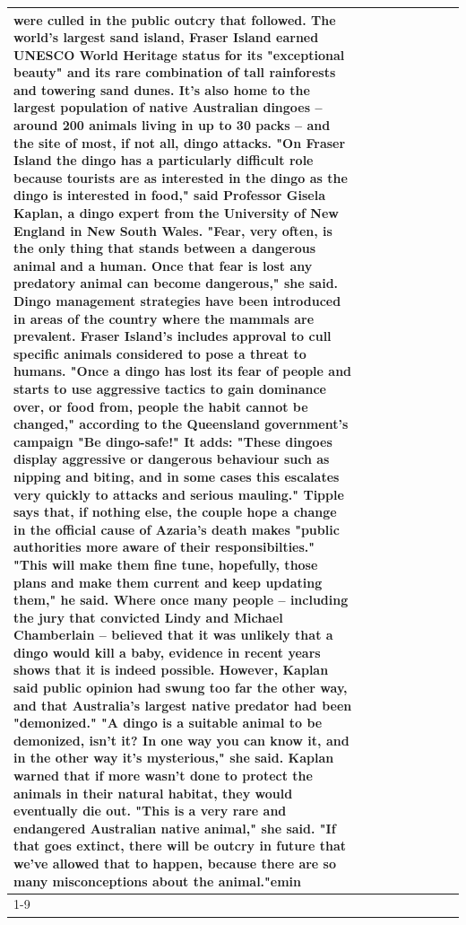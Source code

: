 \begin{table}[H]
\begin{tabular}{lllrlllll}
were culled in the public outcry that followed. The world's largest sand island, Fraser Island earned UNESCO World Heritage status for its "exceptional beauty" and its rare combination of tall rainforests and towering sand dunes. It's also home to the largest population of native Australian dingoes -- around 200 animals living in up to 30 packs -- and the site of most, if not all, dingo attacks. "On Fraser Island the dingo has a particularly difficult role because tourists are as interested in the dingo as the dingo is interested in food," said Professor Gisela Kaplan, a dingo expert from the University of New England in New South Wales. "Fear, very often, is the only thing that stands between a dangerous animal and a human. Once that fear is lost any predatory animal can become dangerous," she said. Dingo management strategies have been introduced in areas of the country where the mammals are prevalent. Fraser Island's includes approval to cull specific animals considered to pose a threat to humans. "Once a dingo has lost its fear of people and starts to use aggressive tactics to gain dominance over, or food from, people the habit cannot be changed," according to the Queensland government's campaign "Be dingo-safe!" It adds: "These dingoes display aggressive or dangerous behaviour such as nipping and biting, and in some cases this escalates very quickly to attacks and serious mauling." Tipple says that, if nothing else, the couple hope a change in the official cause of Azaria's death makes "public authorities more aware of their responsibilties." "This will make them fine tune, hopefully, those plans and make them current and keep updating them," he said. Where once many people -- including the jury that convicted Lindy and Michael Chamberlain -- believed that it was unlikely that a dingo would kill a baby, evidence in recent years shows that it is indeed possible. However, Kaplan said public opinion had swung too far the other way, and that Australia's largest native predator had been "demonized." "A dingo is a suitable animal to be demonized, isn't it? In one way you can know it, and in the other way it's mysterious," she said. Kaplan warned that if more wasn't done to protect the animals in their natural habitat, they would eventually die out. "This is a very rare and endangered Australian native animal," she said. "If that goes extinct, there will be outcry in future that we've allowed that to happen, because there are so many misconceptions about the animal."emin \\
\cline{1-9}

\end{tabular}
\end{table}
